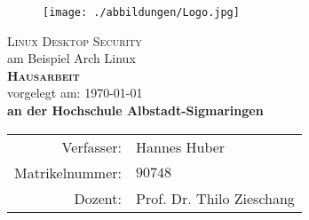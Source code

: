 	\begin{titlepage}
		\renewcommand{\baselinestretch}{1}
		\begin{figure}[htbp]
			\centering
			\texttt{[image: ./abbildungen/Logo.jpg]}
			\label{fig:Logo}
		\end{figure}
		\vspace*{2cm}
		\begin{center}
			\huge \textsf{\textsc{Linux Desktop Security} \\
				{\Large am Beispiel Arch Linux}} \\
			\vspace{2cm}
			\LARGE\textbf{\textsc{Hausarbeit}}\\
			\vspace{0.5cm}
			\normalsize
			vorgelegt am: \today \\
			\vspace{1cm}
			\large \textbf{an der Hochschule Albstadt-Sigmaringen}\\
			\vspace*{\fill}
		\end{center}
		\normalsize{
			\begin{tabular}{rl}
				Verfasser: & {Hannes Huber} \\
				Matrikelnummer: & $ 90748 $\\
				Dozent: & {Prof. Dr. Thilo Zieschang} \\
			\end{tabular}\\
		}
	\end{titlepage}
